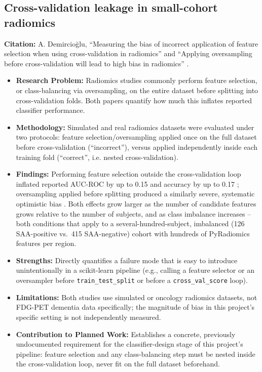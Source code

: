 \subsection{Cross-validation leakage in small-cohort radiomics}
\textbf{Citation:} A. Demircio\u{g}lu, ``Measuring the bias of incorrect application of feature selection when using cross-validation in radiomics'' \cite{demircioglu2021bias} and ``Applying oversampling before cross-validation will lead to high bias in radiomics'' \cite{demircioglu2024oversampling}.

\begin{itemize}
    \item \textbf{Research Problem:} Radiomics studies commonly perform feature selection, or class-balancing via oversampling, on the entire dataset before splitting into cross-validation folds. Both papers quantify how much this inflates reported classifier performance.
    \item \textbf{Methodology:} Simulated and real radiomics datasets were evaluated under two protocols: feature selection/oversampling applied once on the full dataset before cross-validation (``incorrect''), versus applied independently inside each training fold (``correct'', i.e. nested cross-validation).
    \item \textbf{Findings:} Performing feature selection outside the cross-validation loop inflated reported AUC-ROC by up to 0.15 and accuracy by up to 0.17 \cite{demircioglu2021bias}; oversampling applied before splitting produced a similarly severe, systematic optimistic bias \cite{demircioglu2024oversampling}. Both effects grow larger as the number of candidate features grows relative to the number of subjects, and as class imbalance increases -- both conditions that apply to a several-hundred-subject, imbalanced (126 SAA-positive vs.\ 415 SAA-negative) cohort with hundreds of PyRadiomics features per region.
    \item \textbf{Strengths:} Directly quantifies a failure mode that is easy to introduce unintentionally in a scikit-learn pipeline (e.g., calling a feature selector or an oversampler before \texttt{train\_test\_split} or before a \texttt{cross\_val\_score} loop).
    \item \textbf{Limitations:} Both studies use simulated or oncology radiomics datasets, not FDG-PET dementia data specifically; the magnitude of bias in this project's specific setting is not independently measured.
    \item \textbf{Contribution to Planned Work:} Establishes a concrete, previously undocumented requirement for the classifier-design stage of this project's pipeline: feature selection and any class-balancing step must be nested inside the cross-validation loop, never fit on the full dataset beforehand.
\end{itemize}


